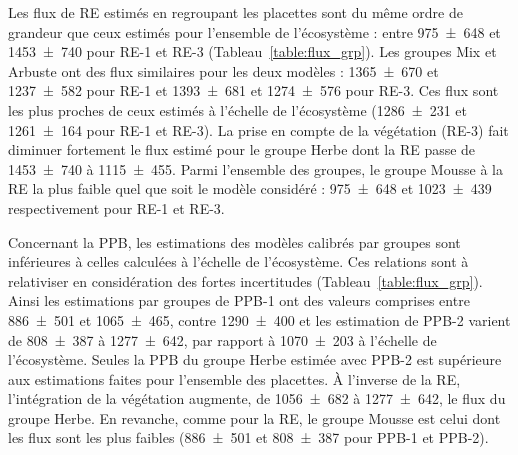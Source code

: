 Les flux de RE estimés en regroupant les placettes sont du même ordre de grandeur que ceux estimés pour l'ensemble de l'écosystème : entre \num{975(648)} et \SI{1453(740)}{\gcma} pour RE-1 et RE-3 (Tableau~\ref{table:flux_grp}).
Les groupes Mix et Arbuste ont des flux similaires pour les deux modèles : \num{1365(670)} et \SI{1237(582)}{\gcma} pour RE-1 et \num{1393(681)} et \SI{1274(576)}{\gcma} pour RE-3.
Ces flux sont les plus proches de ceux estimés à l'échelle de l'écosystème (\num{1286(231)} et \SI{1261(164)}{\gcma} pour RE-1 et RE-3).
La prise en compte de la végétation (RE-3) fait diminuer fortement le flux estimé pour le groupe Herbe dont la RE passe de \num{1453(740)} à \SI{1115(455)}{\gcma}.
Parmi l'ensemble des groupes, le groupe Mousse à la RE la plus faible quel que soit le modèle considéré : \num{975(648)} et \SI{1023(439)}{\gcma} respectivement pour RE-1 et RE-3.

Concernant la PPB, les estimations des modèles calibrés par groupes sont inférieures à celles calculées à l'échelle de l'écosystème.
Ces relations sont à relativiser en considération des fortes incertitudes (Tableau~\ref{table:flux_grp}).
Ainsi les estimations par groupes de PPB-1 ont des valeurs comprises entre \num{886(501)} et \SI{1065(465)}{\gcma}, contre \SI{1290(400)}{\gcma} et les estimation de PPB-2 varient de \num{808(387)} à \SI{1277(642)}{\gcma}, par rapport à \SI{1070(203)}{\gcma} à l'échelle de l'écosystème.
Seules la PPB du groupe Herbe estimée avec PPB-2 est supérieure aux estimations faites pour l'ensemble des placettes.
À l'inverse de la RE, l'intégration de la végétation augmente, de \num{1056(682)} à \SI{1277(642)}{\gcma}, le flux du groupe Herbe.
En revanche, comme pour la RE, le groupe Mousse est celui dont les flux sont les plus faibles (\num{886(501)} et \SI{808(387)}{\gcma} pour PPB-1 et PPB-2).

